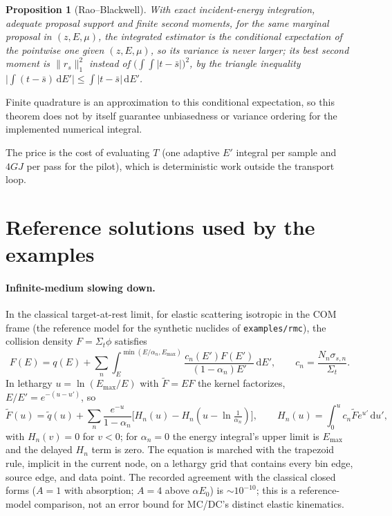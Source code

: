 \documentclass[11pt]{article}
\newtheorem{proposition}{Proposition}
\newcommand{\dd}{\,\mathrm{d}}
\newcommand{\Sigt}{\Sigma_t}
\begin{document}
\begin{proposition}[Rao--Blackwell]
With exact incident-energy integration, adequate proposal support and finite second
moments, for the same marginal proposal in $(z,E,\mu)$, the integrated estimator is the
conditional expectation of the pointwise one given $(z,E,\mu)$, so its variance is never
larger; its best second moment is $\|r_s\|_1^2$ instead of
$\big(\int\!\!\int|t-\bar s|\big)^2$, by the triangle inequality
$\big|\int(t-\bar s)\dd E'\big|\le\int|t-\bar s|\dd E'$.
\end{proposition}
Finite quadrature is an approximation to this conditional expectation, so this
theorem does not by itself guarantee unbiasedness or variance ordering for the
implemented numerical integral.

\noindent The price is the cost of evaluating $T$ (one adaptive $E'$ integral per
sample and $4GJ$ per pass for the pilot), which is deterministic work outside the
transport loop.

\appendix
\section{Reference solutions used by the examples}

\paragraph{Infinite-medium slowing down.} In the classical target-at-rest limit,
for elastic scattering isotropic in the COM frame (the reference model for the
synthetic nuclides of \texttt{examples/rmc}), the
collision density $F=\Sigt\phi$ satisfies
\begin{equation}
  F(E)=q(E)+\sum_n\int_E^{\min(E/\alpha_n,E_{\max})}
  \frac{c_n(E')F(E')}{(1-\alpha_n)E'}\dd E',\qquad c_n=\frac{N_n\sigma_{s,n}}{\Sigt}.
\end{equation}
In lethargy $u=\ln(E_{\max}/E)$ with $\tilde F=EF$ the kernel factorizes,
$E/E'=e^{-(u-u')}$, so
\begin{equation}
  \tilde F(u)=\tilde q(u)+\sum_n\frac{e^{-u}}{1-\alpha_n}
  \Big[H_n(u)-H_n(u-\ln\tfrac{1}{\alpha_n})\Big],\qquad
  H_n(u)=\int_0^u c_n\tilde F e^{u'}\dd u',
\end{equation}
with $H_n(v)=0$ for $v<0$; for $\alpha_n=0$ the energy integral's upper limit
is $E_{\max}$ and the delayed $H_n$ term is zero.
The equation is marched with the trapezoid rule, implicit in the current node, on a
lethargy grid that contains every bin edge, source edge, and data point. The recorded
agreement with the classical closed forms ($A=1$ with absorption; $A=4$ above
$\alpha E_0$) is $\sim10^{-10}$; this is a reference-model comparison, not an error
bound for MC/DC's distinct elastic kinematics.
\end{document}
